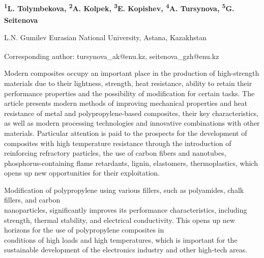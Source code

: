 \vspace{1em}
\begin{articleheader}

{\bfseries
\textsuperscript{1}L. Tolymbekova,
\textsuperscript{2}A. Kolpek,
\textsuperscript{3}E. Kopishev,
\textsuperscript{4}A. Tursynova\textsuperscript{\envelope },
\textsuperscript{5}G. Seitenova\textsuperscript{\envelope }
}
\end{articleheader}

\begin{affiliation}
L.N. Gumilev Eurasian National University, Astana, Kazakhstan

\raggedright \textsuperscript{\envelope }Corresponding author: tursynova\_ak@enu.kz, seitenova\_gzh@enu.kz
\end{affiliation}

Modern composites occupy an important place in the production of
high-strength materials due to their lightness, strength, heat
resistance, ability to retain their performance properties and the
possibility of modification for certain tasks. The article presents
modern methods of improving mechanical properties and heat resistance of
metal and polypropylene-based composites, their key characteristics, as
well as modern processing technologies and innovative combinations with
other materials. Particular attention is paid to the prospects for the
development of composites with high temperature resistance through the
introduction of reinforcing refractory particles, the use of carbon
fibers and nanotubes, phosphorus-containing flame retardants, lignin,
elastomers, thermoplastics, which opens up new opportunities for their
exploitation.

Modification of polypropylene using various fillers, such as polyamides,
chalk fillers, and carbon \\nanoparticles, significantly improves its
performance characteristics, including strength, thermal stability, and
electrical conductivity. This opens up new horizons for the use of
polypropylene composites in \\conditions of high loads and high
temperatures, which is important for the sustainable development of the
electronics industry and other high-tech areas.

